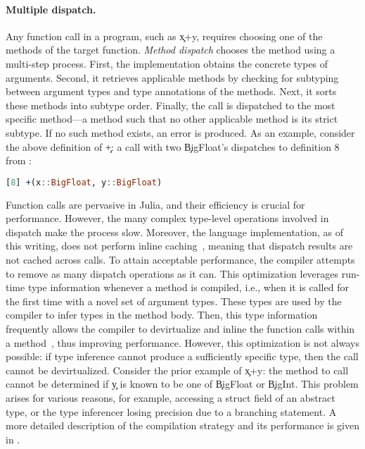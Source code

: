 \paragraph*{Multiple dispatch.}
Any function call in a program, such as \c{x+y}, requires choosing one of the
methods of the target function. \emph{Method dispatch} chooses the method using
a multi-step process.
First, the implementation obtains the concrete types of arguments. Second, it
retrieves applicable methods by checking for subtyping between argument types
and type annotations of the methods. Next, it sorts these methods into subtype
order. Finally, the call is dispatched to the most specific method---a method
such that no other applicable method is its strict subtype. If no such
method exists, an error is produced. As an example, consider the above
definition of \c{+}: a call with two \c{BigFloat}'s dispatches to
definition 8 from : 
\begin{lstlisting}[language=julia]
[8] +(x::BigFloat, y::BigFloat)
\end{lstlisting}

Function calls are pervasive in Julia, and their efficiency is crucial for
performance. However, the many complex type-level operations involved in dispatch
make the process slow. Moreover, the language implementation, as of this writing,
does not perform inline caching~\cite{DS84}, meaning that dispatch results are
not cached across calls. To attain acceptable performance, the compiler attempts
to remove as many dispatch operations as it can. This optimization leverages
run-time type information whenever a method is compiled, i.e., when it is called
for the first time with a novel set of argument types.  These types are used by
the compiler to infer types in the method body. Then, this type information
frequently allows the compiler to devirtualize and inline the function calls
within a method~\cite{aigner}, thus improving performance. However, this
optimization is not always possible: if type inference cannot produce a
sufficiently specific type, then the call cannot be devirtualized. Consider the
prior example of \c{x+y}: the method to call cannot be determined
if \c{y} is known to be one of \c{BigFloat} or \c{BigInt}. This problem arises for
various reasons, for example, accessing a struct field of an abstract type, or
the type inferencer losing precision due to a branching statement. A more
detailed description of the compilation strategy and its performance is given in
\cite{oopsla18a}.

